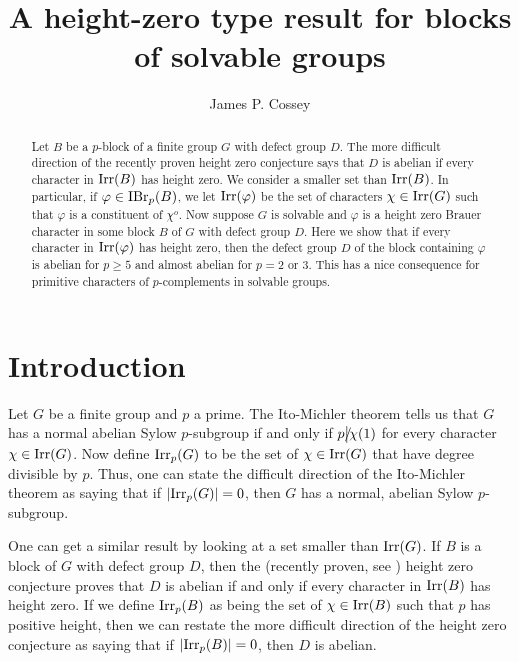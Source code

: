 \documentclass[11pt]{amsart}
\newcommand \irr {\textup{Irr}}
\newcommand \ibr {{\textup{IBr}}_p}
\newcommand \dvd {\hbox {\big|}}
\newcommand \ndvd {\hbox {/}\kern-5pt\dvd}
\begin{document}
\title{A height-zero type result for blocks of solvable groups}


\author{James P. Cossey}

\address{Department of Mathematics, University of Akron, Akron, OH 44325}







\begin{abstract}  Let $B$ be a $p$-block of a finite group $G$ with defect group $D$.  The more difficult direction of the recently proven height zero conjecture says that $D$ is abelian if every character in $\irr(B)$ has height zero.  We consider a smaller set than $\irr(B)$.  In particular, if $\varphi \in \ibr(B)$, we let $\irr(\varphi)$ be the set of characters $\chi \in \irr(G)$ such that $\varphi$ is a constituent of $\chi^o$.   Now suppose $G$ is solvable and $\varphi$ is a height zero Brauer character in some block $B$ of $G$ with defect group $D$.  Here we show that if every character in $\irr(\varphi)$ has height zero, then the defect group $D$ of the block containing $\varphi$ is abelian for $p \geq 5$ and almost abelian for $p = 2$ or $3$.  This has a nice consequence for primitive characters of $p$-complements in solvable groups.
  
\end{abstract}

\maketitle

\section{Introduction} 

Let $G$ be a finite group and $p$ a prime.  The Ito-Michler theorem \cite{itomichler} tells us that $G$ has a normal abelian Sylow $p$-subgroup if and only if $p \ndvd \chi(1)$ for every character $\chi \in \irr(G)$.  Now define $\irr_p(G)$ to be the set of $\chi \in \irr(G)$ that have degree divisible by $p$.  Thus, one can state the difficult direction of the Ito-Michler theorem as saying that if $|\irr_p(G)| = 0$, then $G$ has a normal, abelian Sylow $p$-subgroup.

One can get a similar result by looking at a set smaller than $\irr(G)$.  If $B$ is a block of $G$ with defect group $D$, then the (recently proven, see \cite{heightzero}) height zero conjecture proves that $D$ is abelian if and only if every character in $\irr(B)$ has height zero.  If we define $\irr_p(B)$ as being the set of $\chi \in \irr(B)$ such that $p$ has positive height, then we can restate the more difficult direction of the height zero conjecture as saying that if $|\irr_p(B)| = 0$, then $D$ is abelian.
\end{document}
